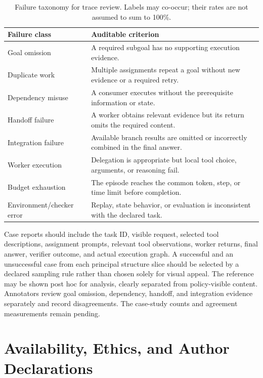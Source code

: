 \begin{table}[ht]
\centering\small
\caption{Failure taxonomy for trace review. Labels may co-occur; their rates are not assumed to sum to 100\%.}
\label{tab:failures}
\begin{tabularx}{\linewidth}{lY}
\toprule
Failure class & Auditable criterion \\
\midrule
Goal omission & A required subgoal has no supporting execution evidence. \\
Duplicate work & Multiple assignments repeat a goal without new evidence or a required retry. \\
Dependency misuse & A consumer executes without the prerequisite information or state. \\
Handoff failure & A worker obtains relevant evidence but its return omits the required content. \\
Integration failure & Available branch results are omitted or incorrectly combined in the final answer. \\
Worker execution & Delegation is appropriate but local tool choice, arguments, or reasoning fail. \\
Budget exhaustion & The episode reaches the common token, step, or time limit before completion. \\
Environment/checker error & Replay, state behavior, or evaluation is inconsistent with the declared task. \\
\bottomrule
\end{tabularx}
\end{table}

Case reports should include the task ID, visible request, selected tool descriptions, assignment prompts, relevant tool observations, worker returns, final answer, verifier outcome, and actual execution graph. A successful and an unsuccessful case from each principal structure slice should be selected by a declared sampling rule rather than chosen solely for visual appeal. The reference may be shown post hoc for analysis, clearly separated from policy-visible content. Annotators review goal omission, dependency, handoff, and integration evidence separately and record disagreements. The case-study counts and agreement measurements remain pending.

\section{Availability, Ethics, and Author Declarations}
\label{app:declarations}

